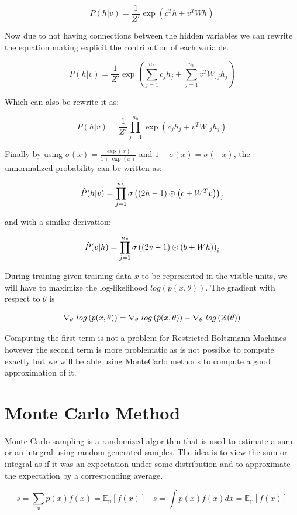 $$ P(h | v) = \frac{1}{Z'} \exp \left(c^{T}h + v^{T}W h  \right) $$

\noindent Now due to not having connections between the hidden variables we can rewrite the equation making explicit the contribution of each variable.

$$ P(h | v) = \frac{1}{Z'} \exp{ \left( \sum_{j=1}^{n_h} c_j h_j + \sum_{j=1}^{n_h} v^{T} W_{: j} h_j  \right)} $$

\noindent Which can also be rewrite it as:

$$  P(h | v) = \frac{1}{Z'} \prod_{j=1}^{n_h} \exp \left( c_j h_j + v^{T} W_{: j} h_j  \right)  $$

\noindent Finally by using $\sigma(x) = \frac{\exp{(x)}}{1 + \exp{(x)}}$ and $1 - \sigma(x) = \sigma(-x)$, the unnormalized probability can be written as:

$$ \Hat{P} (h | v) = \prod_{j=1}^{n_h}  \sigma \left( \left( 2h -1 \right) \odot \left( c + W^T v \right) \right)_j $$

\noindent and with a similar derivation:

$$ \Hat{P} (v | h) = \prod_{j=1}^{n_v}  \sigma \left( \left( 2v -1 \right) \odot \left( b + W h \right) \right)_i $$

\newpage
\noindent During training given training data $x$ to be represented in the visible units, we will have to maximize the log-likelihood $log(p(x, \theta))$. The gradient with respect to $\theta$ is

$$\nabla_{\theta}~ log \left(p(x, \theta)\right) = \nabla_{\theta}~ log \left(\Hat{p}(x, \theta)\right) - \nabla_{\theta}~  log \left(Z (\theta)\right) $$

\noindent Computing the first term is not a problem for Restricted Boltzmann Machines however the second term is more problematic as is not possible to compute exactly but we will be able using MonteCarlo methods to compute a good approximation of it.


\section{Monte Carlo Method}

Monte Carlo sampling is a randomized algorithm that is used to estimate a sum or an integral using random generated samples. The idea is to view the sum or integral as if it was an expectation under some distribution and to approximate the expectation by a corresponding average.

$$ s = \sum_{x} p(x)f(x) = \mathbb{E_{p}} \left[ f(x) \right] ~~~~ s = \int {p(x)f(x)dx} = \mathbb{E_{p}} \left[ f(x) \right] $$

